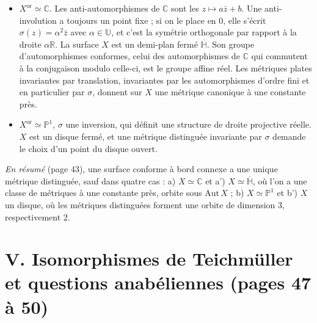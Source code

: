 \documentclass[11pt,a4paper]{article}
\begin{document}
\begin{itemize}
  \item[a')] $X^{\mathrm{or}} \simeq \mathbb{C}$. Les anti-automorphismes de
  $\mathbb{C}$ sont les $z \mapsto a\bar z + b$. Une anti-involution a
  toujours un point fixe ; si on le place en $0$, elle s'écrit
  $\sigma(z) = \alpha^{2}\bar z$ avec $\alpha \in \mathbb{U}$, et c'est la
  symétrie orthogonale par rapport à la droite $\alpha\mathbb{R}$. La surface
  $X$ est un demi-plan fermé $\overline{\mathbb{H}}$. Son groupe
  d'automorphismes conformes, celui des automorphismes de $\mathbb{C}$ qui
  commutent à la conjugaison modulo celle-ci, est le groupe affine réel. Les
  métriques plates invariantes par translation, invariantes par les
  automorphismes d'ordre fini et en particulier par $\sigma$, donnent sur
  $X$ une métrique canonique à une constante près.
  \item[b')] $X^{\mathrm{or}} \simeq \mathbb{P}^{1}$, $\sigma$ une inversion,
  qui définit une structure de droite projective réelle. $X$ est un disque
  fermé, et une métrique distinguée invariante par $\sigma$ demande le choix
  d'un point du disque ouvert.
\end{itemize}

\emph{En résumé} (page 43), une surface conforme à bord connexe a une unique
métrique distinguée, sauf dans quatre cas : a) $X \simeq \mathbb{C}$ et a')
$X \simeq \overline{\mathbb{H}}$, où l'on a une classe de métriques à une
constante près, orbite sous $\mathrm{Aut}\,X$ ; b)
$X \simeq \mathbb{P}^{1}$ et b') $X$ un disque, où les métriques distinguées
forment une orbite de dimension $3$, respectivement $2$.

\section*{V. Isomorphismes de Teichmüller et questions anabéliennes (pages 47 à 50)}
\end{document}
